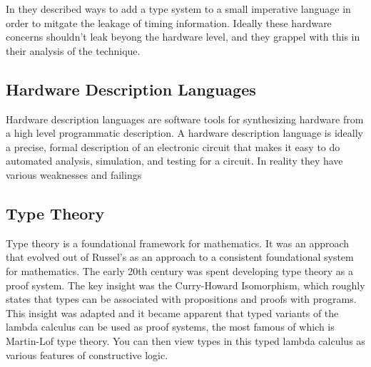 \documentclass[12pt, titlepage]{article}
\begin{document}


In \cite{languagebased} they described ways to add a type system to a small imperative language in order to mitgate the leakage of timing information.
Ideally these hardware concerns shouldn't leak beyong the hardware level, and they grappel with this in their analysis of the technique. 


\subsection{Hardware Description Languages}

Hardware description languages are software tools for synthesizing hardware from a high level programmatic description.
A hardware description language is ideally a precise, formal description of an electronic circuit that 
makes it easy to do automated analysis, simulation, and testing for a circuit. In reality they have
various weaknesses and failings \subsection{Type Theory}
Type theory is a foundational framework for mathematics. It was an approach that evolved out of Russel's \cite{Principia}
as an approach to a consistent foundational system for mathematics. The early 20th century was spent developing type theory
as a proof system. The key insight was the Curry-Howard Isomorphism, which roughly states that types can be associated with
propositions and proofs with programs. This insight was adapted and it became apparent that typed variants of the lambda
calculus can be used as proof systems, the most famous of which is Martin-Lof type theory. You can then view types in
this typed lambda calculus as various features of constructive logic.
\end{document}
